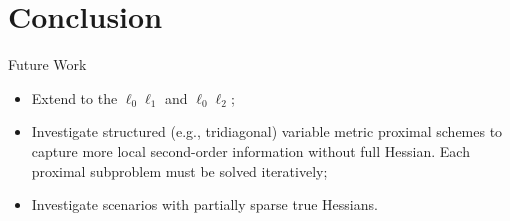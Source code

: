 \section{Conclusion}

\begin{frame}{Future Work}
\begin{itemize}
\item Extend to the $\ell_0\ell_1$ and $\ell_0\ell_2$;
\item Investigate structured (e.g., tridiagonal) variable metric proximal schemes to capture more local second-order information without full Hessian. Each proximal subproblem must be solved iteratively;
\item Investigate scenarios with partially sparse true Hessians.
\end{itemize}
\end{frame}